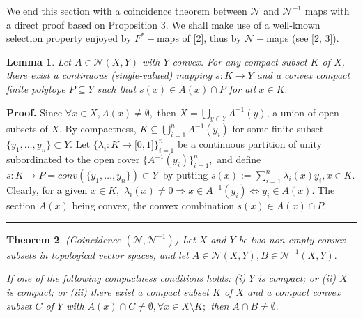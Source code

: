 \documentclass{article}
\newtheorem{theorem}{Theorem}
\newtheorem{lemma}[theorem]{Lemma}
\newenvironment{proof}[1][Proof]{\noindent\textbf{#1.} }{\ \rule{0.5em}{0.5em}}
\begin{document}
We end this section with a coincidence theorem between $\mathcal{N}$ and $%
\mathcal{N}^{-1}$ maps with a direct proof based on Proposition 3. We shall
make use of a well-known selection property enjoyed by $F^{\ast }-$maps of
[2], thus by $\mathcal{N}-$maps (see [2, 3]).

\begin{lemma}
Let $A\in \mathcal{N}(X,Y)$ with $Y$ convex. For any compact subset $K$ of $%
X $, there exist a continuous (single-valued) mapping $s:K\longrightarrow Y$
and a convex compact finite polytope $P\subseteq Y$ such that $s(x)\in
A(x)\cap P$ for all $x\in K.$
\end{lemma}

\begin{proof}
Since $\forall x\in X,A(x)\neq \emptyset ,$ then $X=\bigcup_{y\in
Y}A^{-1}(y) $, a union of open subsets of $X.$ By compactness, $K\subseteq
\bigcup_{i=1}^{n}A^{-1}(y_{i})$ for some finite subset $\{y_{1},\ldots
,y_{n}\}\subset Y.$ Let $\{\lambda _{i}:K\longrightarrow \lbrack
0,1]\}_{i=1}^{n}$ be a continuous partition of unity subordinated to the
open cover $\{A^{-1}(y_{i})\}_{i=1}^{n},$ and define $s:K\longrightarrow
P=conv(\{y_{1},\ldots ,y_{n}\})\subset Y$\ by putting $s(x):=\sum_{i=1}^{n}%
\lambda _{i}(x)y_{i},x\in K.$ Clearly, for a given $x\in K,$ $\lambda
_{i}(x)\neq 0\Longrightarrow x\in A^{-1}(y_{i})\Longleftrightarrow y_{i}\in
A(x).$ The section $A(x)$ being convex, the convex combination $s(x)\in
A(x)\cap P.$
\end{proof}

\begin{theorem}
(Coincidence $(\mathcal{N},\mathcal{N}^{-1})$) Let $X$ and $Y$ be two
non-empty convex subsets in topological vector spaces, and let $A\in 
\mathcal{N}(X,Y),B\in \mathcal{N}^{-1}(X,Y).$

If one of the following compactness conditions holds: (i) $Y$ is compact; or
(ii) $X$ is compact; or (iii) there exist a compact subset $K$ of $X$ and a
compact convex subset $C$ of $Y$ with $A(x)\cap C\neq \emptyset ,\forall
x\in X\setminus K;$ then $A\cap B\neq \emptyset .$
\end{theorem}
\end{document}
